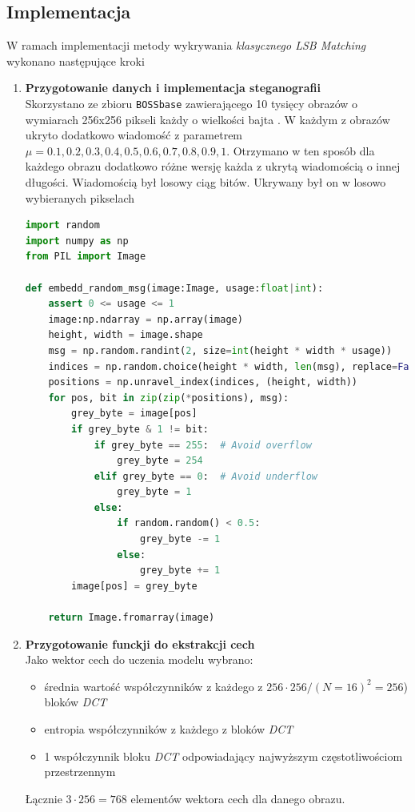     \subsection{Implementacja}
        W ramach implementacji metody wykrywania \textit{klasycznego LSB Matching} wykonano następujące kroki
        \begin{enumerate}
            \item \textbf{Przygotowanie danych i implementacja steganografii}\\
            Skorzystano ze zbioru \texttt{BOSSbase} zawierającego 10 tysięcy obrazów o wymiarach 256x256 pikseli każdy o wielkości bajta \cite{bossbase}. W każdym z obrazów ukryto dodatkowo wiadomość z parametrem $\mu = 0.1, 0.2, 0.3, 0.4, 0.5, 0.6, 0.7, 0.8, 0.9, 1$. Otrzymano w ten sposób dla każdego obrazu dodatkowo różne wersję każda z ukrytą wiadomością o innej długości. Wiadomością był losowy ciąg bitów. Ukrywany był on w losowo wybieranych pikselach

            \begin{lstlisting}[language=Python, caption={Funkcja ukrywająca wiadomość za pomocą \textit{LSB Matching}.}]
import random
import numpy as np
from PIL import Image

def embedd_random_msg(image:Image, usage:float|int):
    assert 0 <= usage <= 1
    image:np.ndarray = np.array(image)
    height, width = image.shape
    msg = np.random.randint(2, size=int(height * width * usage))
    indices = np.random.choice(height * width, len(msg), replace=False)
    positions = np.unravel_index(indices, (height, width))
    for pos, bit in zip(zip(*positions), msg):
        grey_byte = image[pos]
        if grey_byte & 1 != bit:
            if grey_byte == 255:  # Avoid overflow
                grey_byte = 254
            elif grey_byte == 0:  # Avoid underflow
                grey_byte = 1
            else:
                if random.random() < 0.5:
                    grey_byte -= 1
                else:
                    grey_byte += 1
        image[pos] = grey_byte

    return Image.fromarray(image)
            \end{lstlisting}
            
            \item \textbf{Przygotowanie funckji do ekstrakcji cech}\\
            Jako wektor cech do uczenia modelu wybrano:
            \begin{itemize}
                \item średnia wartość współczynników z każdego z $256\cdot256 / (N=16)^2 = 256$) bloków \textit{DCT}
                \item entropia współczynników z każdego z bloków \textit{DCT}
                \item 1 współczynnik bloku \textit{DCT} odpowiadający najwyższym częstotliwościom przestrzennym
            \end{itemize}
            Łącznie $3\cdot256=768$ elementów wektora cech dla danego obrazu.


\end{enumerate}

